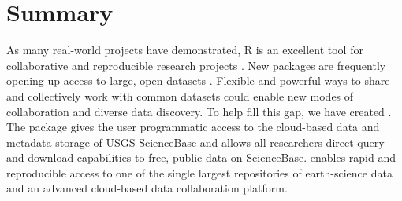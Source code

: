 \section{Summary}

As many real-world projects have demonstrated, R is
an excellent tool for collaborative and reproducible
research projects \citep{Gandrud2013}. New packages are
frequently opening up access to large, open datasets 
\citep{rNOMADS, rFDSN}. Flexible and powerful
ways to share and collectively work with common datasets
could enable new modes of collaboration and diverse data discovery.
To help fill this gap, we have created . 
The  package gives the user programmatic access to the
cloud-based data and metadata storage of USGS ScienceBase
and allows all researchers direct query and download
capabilities to free, public data on ScienceBase.
 enables rapid and reproducible
access to one of the single
largest repositories of earth-science data and an advanced
cloud-based data collaboration platform.
